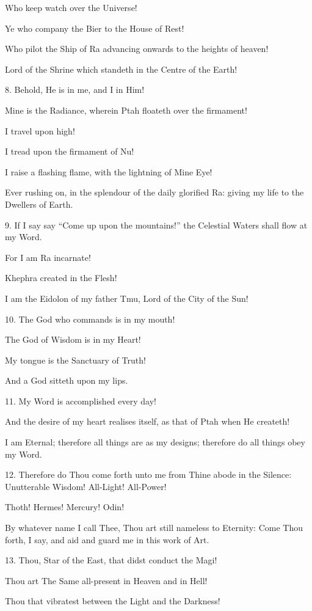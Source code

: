 Who keep watch over the Universe!

Ye who company the Bier to the House of Rest!

Who pilot the Ship of Ra advancing onwards to the heights of heaven!

Lord of the Shrine which standeth in the Centre of the Earth!

8. Behold, He is in me, and I in Him!

Mine is the Radiance, wherein Ptah floateth over the firmament!

I travel upon high!

I tread upon the firmament of Nu!

I raise a flashing flame, with the lightning of Mine Eye!

Ever rushing on, in the splendour of the daily glorified Ra: giving my life to the Dwellers of Earth.

9. If I say say \enquote{Come up upon the mountains!} the Celestial Waters shall flow at my Word.

For I am Ra incarnate!

Khephra created in the Flesh!

I am the Eidolon of my father Tmu, Lord of the City of the Sun!

10. The God who commands is in my mouth!

The God of Wisdom is in my Heart!

My tongue is the Sanctuary of Truth!

And a God sitteth upon my lips.

11. My Word is accomplished every day!

And the desire of my heart realises itself, as that of Ptah when He createth!

I am Eternal; therefore all things are as my designs; therefore do all things obey my Word.

12. Therefore do Thou come forth unto me from Thine abode in the Silence: Unutterable Wisdom! All-Light! All-Power!

Thoth! Hermes! Mercury! Odin!

By whatever name I call Thee, Thou art still nameless to Eternity: Come Thou forth, I say, and aid and guard me in this work of Art.

13. Thou, Star of the East, that didst conduct the Magi!

Thou art The Same all-present in Heaven and in Hell!

Thou that vibratest between the Light and the Darkness!

